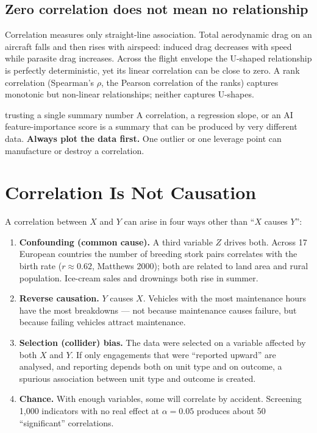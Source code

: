 \documentclass[11pt]{article}
\begin{document}
\subsection{Zero correlation does not mean no relationship}
Correlation measures only straight-line association. Total aerodynamic drag on an aircraft falls and then rises with airspeed: induced drag decreases with speed while parasite drag increases. Across the flight envelope the U-shaped relationship is perfectly deterministic, yet its linear correlation can be close to zero. A rank correlation (Spearman's $\rho$, the Pearson correlation of the ranks) captures monotonic but non-linear relationships; neither captures U-shapes.

\begin{pitfall}{trusting a single summary number}
A correlation, a regression slope, or an AI feature-importance score is a summary that can be produced by very different data. \textbf{Always plot the data first.} One outlier or one leverage point can manufacture or destroy a correlation.
\end{pitfall}

\section{Correlation Is Not Causation}
A correlation between $X$ and $Y$ can arise in four ways other than ``$X$ causes $Y$'':
\begin{enumerate}
\item \textbf{Confounding (common cause).} A third variable $Z$ drives both. Across 17 European countries the number of breeding stork pairs correlates with the birth rate ($r\approx0.62$, Matthews 2000); both are related to land area and rural population. Ice-cream sales and drownings both rise in summer.
\item \textbf{Reverse causation.} $Y$ causes $X$. Vehicles with the most maintenance hours have the most breakdowns --- not because maintenance causes failure, but because failing vehicles attract maintenance.
\item \textbf{Selection (collider) bias.} The data were selected on a variable affected by both $X$ and $Y$. If only engagements that were ``reported upward'' are analysed, and reporting depends both on unit type and on outcome, a spurious association between unit type and outcome is created.
\item \textbf{Chance.} With enough variables, some will correlate by accident. Screening 1,000 indicators with no real effect at $\alpha=0.05$ produces about 50 ``significant'' correlations.
\end{enumerate}
\end{document}
